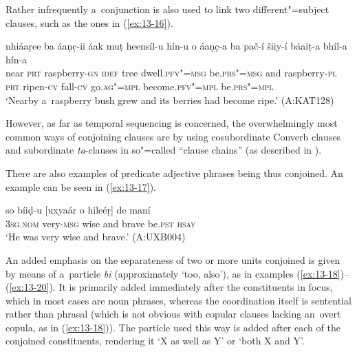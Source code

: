 Rather infrequently a~conjunction is also used to link two different"=subject clauses, such as the ones in (\ref{ex:13-16}).

\begin{exe}
\ex
\label{ex:13-16}
\gll nhiáaṛee ba áaṇc̣-ii áak muṭ heensíl-u hín-u o áaṇc̣-a ba pač-í šiiy-í báaiṭ-a bhíl-a hín-a \\
near \textsc{prt} raspberry-\textsc{gn} \textsc{idef} tree dwell.\textsc{pfv"=msg}  be.\textsc{prs"=msg} and raspberry-\textsc{pl} \textsc{prt} ripen-\textsc{cv} fall-\textsc{cv} go.\textsc{ag"=mpl} become.\textsc{pfv"=mpl} be.\textsc{prs"=mpl} \\
\glt `Nearby a~raspberry bush grew and its berries had become ripe.' (A:KAT128) 
\end{exe}

However, as far as temporal sequencing is concerned, the overwhelmingly most common ways of conjoining clauses are by using cosubordinate Converb clauses and subordinate \textit{ta}-clauses in so"=called ``clause chains'' (as described in ).


There are also examples of predicate adjective phrases being thus conjoined. An example can be seen in (\ref{ex:13-17}).

\begin{exe}
\ex
\label{ex:13-17}
\gll so bíiḍ-u [uxyaár o hileéṛ] de maní  \\
\textsc{3sg.nom} very-\textsc{msg} wise and brave be.\textsc{pst} \textsc{hsay} \\
\glt `He was very wise and brave.' (A:UXB004) 
\end{exe}

 An added emphasis on the separateness of two or more units conjoined is given by means of a~particle \textit{bi} (approximately `too, also'), as in examples (\ref{ex:13-18})--(\ref{ex:13-20}). It is primarily added immediately after the constituents in focus, which in most cases are noun phrases, whereas the coordination itself is sentential rather than phrasal (which is not obvious with copular clauses lacking an~overt copula, as in (\ref{ex:13-18})). The particle used this way is added after each of the conjoined constituents, rendering it `X as well as Y' or `both X and Y'.

